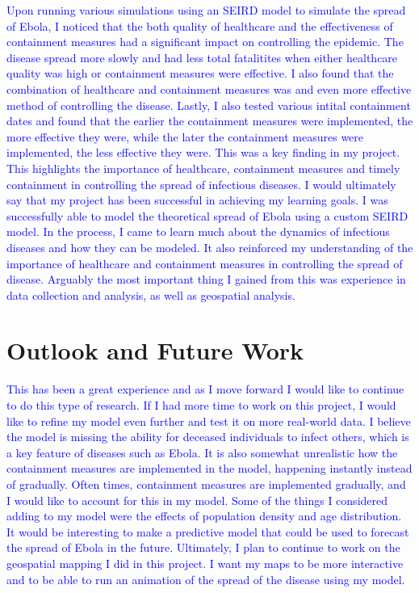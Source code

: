 \documentclass[%
 reprint,
superscriptaddress,
 amsmath,amssymb,
 aps,
floatfix,
]{revtex4-2}
\begin{document}
\textcolor{blue}{
        Upon running various simulations using an SEIRD model to simulate the spread of Ebola, 
    I noticed that the both quality of healthcare and the effectiveness of containment measures had a significant impact on controlling the epidemic.
    The disease spread more slowly and had less total fatalitites when either healthcare quality was high or containment measures were effective. 
    I also found that the combination of healthcare and containment measures was and even more effective method of controlling the disease.
    Lastly, I also tested various intital containment dates and found that the earlier the containment measures were implemented, the more effective they were,
    while the later the containment measures were implemented, the less effective they were. This was a key finding in my project.
    This highlights the importance of healthcare, containment measures and timely containment in controlling the spread of infectious diseases.
}
\textcolor{blue}{
    I would ultimately say that my project has been successful in achieving my learning goals.
    I was successfully able to model the theoretical spread of Ebola using a custom SEIRD model.
    In the process, I came to learn much about the dynamics of infectious diseases and how they can be modeled.
    It also reinforced my understanding of the importance of healthcare and containment measures in controlling the spread of disease.
    Arguably the most important thing I gained from this was experience in data collection and analysis, as well as geospatial analysis.
}
\section{Outlook and Future Work}
\textcolor{blue}{
    This has been a great experience and as I move forward I would like to continue to do this type of research. If I had more time to work on this project,
    I would like to refine my model even further and test it on more real-world data.
    I believe the model is missing the ability for deceased individuals to infect others, which is a key feature of diseases such as Ebola.
    It is also somewhat unrealistic how the containment measures are implemented in the model, happening instantly instead of gradually.
    Often times, containment measures are implemented gradually, and I would like to account for this in my model.
    Some of the things I considered adding to my model were the effects of population density and age distribution.
    It would be interesting to make a predictive model that could be used to forecast the spread of Ebola in the future.
    Ultimately, I plan to continue to work on the geospatial mapping I did in this project. I want my maps to be more interactive and to be able to run an animation of the spread of the disease using my model.
    }
\end{document}
